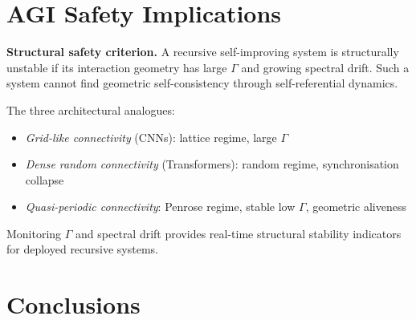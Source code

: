 \documentclass[12pt,a4paper]{article}
\theoremstyle{plain}
\theoremstyle{definition}
\begin{document}
\section{AGI Safety Implications}
\label{sec:agi}

\begin{keyresult}
\textbf{Structural safety criterion.} A recursive self-improving system
is structurally unstable if its interaction geometry has large $\Gamma$
and growing spectral drift. Such a system cannot find geometric
self-consistency through self-referential dynamics.
\end{keyresult}

The three architectural analogues:
\begin{itemize}
  \item \emph{Grid-like connectivity} (CNNs): lattice regime, large $\Gamma$
  \item \emph{Dense random connectivity} (Transformers): random regime, synchronisation collapse
  \item \emph{Quasi-periodic connectivity}: Penrose regime, stable low $\Gamma$, geometric aliveness
\end{itemize}

Monitoring $\Gamma$ and spectral drift provides real-time structural stability
indicators for deployed recursive systems.

\section{Conclusions}
\label{sec:conclusions}
\end{document}
